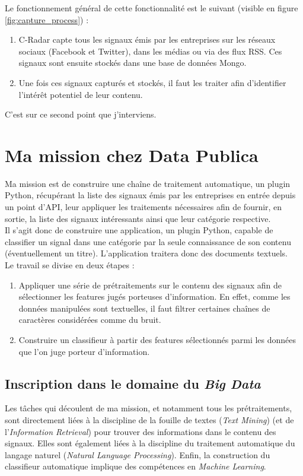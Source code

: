     Le fonctionnement général de cette fonctionnalité est le suivant (visible en figure \ref{fig:capture_process}) :
    \begin{enumerate}
        \item C-Radar capte tous les signaux émis par les entreprises sur les réseaux sociaux (Facebook et Twitter), dans les médias ou via des flux RSS. Ces signaux sont ensuite stockés dans une base de données Mongo.
        \item Une fois ces signaux capturés et stockés, il faut les traiter afin d'identifier l'intérêt potentiel de leur contenu.
    \end{enumerate}
    C'est sur ce second point que j'interviens.

\section{Ma mission chez Data Publica} %
\label{sec:ma_mission_chez_data_publica}
    Ma mission est de construire une chaîne de traitement automatique, un plugin Python, récupérant la liste des signaux émis par les entreprises en entrée depuis un point d'API, leur appliquer les traitements nécessaires afin de fournir, en sortie, la liste des signaux intéressants ainsi que leur catégorie respective.\\

    Il s'agit donc de construire une application, un plugin Python, capable de classifier un signal dans une catégorie par la seule connaissance de son contenu (éventuellement un titre). L'application traitera donc des documents textuels.\\
    Le travail se divise en deux étapes :
    \begin{enumerate}
        \item Appliquer une série de prétraitements sur le contenu des signaux afin de sélectionner les features jugés porteuses d'information. En effet, comme les données manipulées sont textuelles, il faut filtrer certaines chaînes de caractères considérées comme du bruit.
        \item Construire un classifieur à partir des features sélectionnés parmi les données que l'on juge porteur d'information.
    \end{enumerate}

    \subsection{Inscription dans le domaine du \textit{Big Data}}
        Les tâches qui découlent de ma mission, et notamment tous les prétraitements, sont directement liées à la discipline de la fouille de textes (\textit{Text Mining}) (et de l'\textit{Information Retrieval}) pour trouver des informations dans le contenu des signaux. Elles sont également liées à la discipline du traitement automatique du langage naturel (\textit{Natural Language Processing}). Enfin, la construction du classifieur automatique implique des compétences en \textit{Machine Learning}.\\


